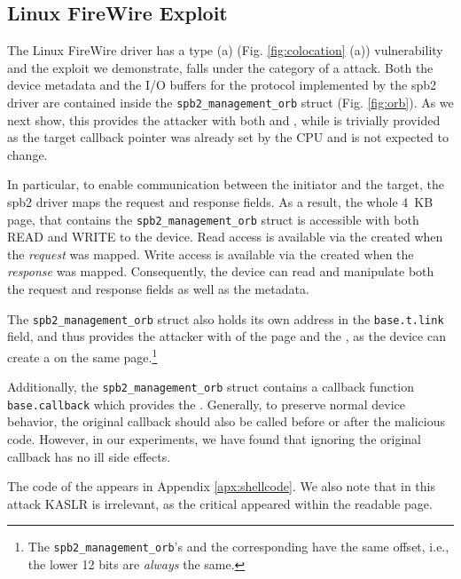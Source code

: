 \subsection{Linux FireWire Exploit} \label{sec:sbp2_attack}

The Linux FireWire driver has a type (a) (Fig. \ref{fig:colocation} (a)) \subpage{} vulnerability and the exploit we demonstrate, falls under the category of a \simple{} attack. Both the device metadata and the I/O buffers for the \spb{} protocol implemented by the spb2 driver are contained inside the \texttt{spb2\_management\_orb} struct (Fig. \ref{fig:orb}). As we next show, this provides the attacker with both \motivation and \means{}, while \oportunity is trivially provided as the target callback pointer was already set by the CPU and is not expected to change.

In particular, to enable communication between the initiator and the target, the spb2 driver maps the request and response fields. As a result, the whole 4~KB page, that contains the \texttt{spb2\_management\_orb} struct is accessible with both READ and WRITE to the device. Read access is available via the \iova{} created when the \emph{request} was mapped. Write access is available via the \iova{} created when the \emph{response} was mapped. Consequently, the device can read and manipulate both the request and response fields as well as the metadata. 

The \texttt{spb2\_management\_orb} struct also holds its own address in the \texttt{base.t.link} field, and thus provides the attacker with \kva of the page and the \motivation, as the device can create a \mabaf on the same page.\footnote{The \texttt{spb2\_management\_orb}'s \kva and the corresponding \iova{} have the same offset, i.e., the lower 12 bits are \emph{always} the same.}


Additionally, the \texttt{spb2\_management\_orb} struct contains a callback function \texttt{base.callback} which provides the \means. Generally, to preserve normal device behavior, the original callback should also be called before or after the malicious code. However, in our experiments, we have found that ignoring the original callback has no ill side effects. 



The code of the \mabaf{} appears in Appendix \ref{apx:shellcode}. We also note that in this attack KASLR is irrelevant, as the critical \kva{} appeared within the readable page.

